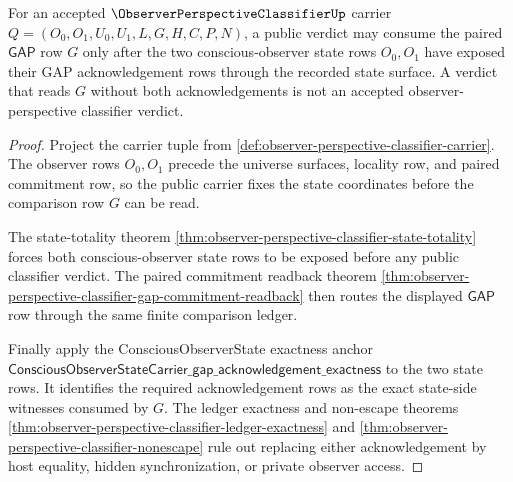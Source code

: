 \begin{theorem}
\label{thm:observer-perspective-classifier-observer-state-gap-route}
For an accepted $\ObserverPerspectiveClassifierUp$ carrier $Q=(O_0,O_1,U_0,U_1,L,G,H,C,P,N)$, a public verdict may consume the paired $\mathsf{GAP}$ row $G$ only after the two conscious-observer state rows $O_0,O_1$ have exposed their GAP acknowledgement rows through the recorded state surface. A verdict that reads $G$ without both acknowledgements is not an accepted observer-perspective classifier verdict.
\end{theorem}
\begin{proof}
Project the carrier tuple from \autoref{def:observer-perspective-classifier-carrier}. The observer rows $O_0,O_1$ precede the universe surfaces, locality row, and paired commitment row, so the public carrier fixes the state coordinates before the comparison row $G$ can be read.

The state-totality theorem \autoref{thm:observer-perspective-classifier-state-totality} forces both conscious-observer state rows to be exposed before any public classifier verdict. The paired commitment readback theorem \autoref{thm:observer-perspective-classifier-gap-commitment-readback} then routes the displayed $\mathsf{GAP}$ row through the same finite comparison ledger.

Finally apply the ConsciousObserverState exactness anchor $\mathsf{ConsciousObserverStateCarrier\_gap\_acknowledgement\_exactness}$ to the two state rows. It identifies the required acknowledgement rows as the exact state-side witnesses consumed by $G$. The ledger exactness and non-escape theorems \autoref{thm:observer-perspective-classifier-ledger-exactness} and \autoref{thm:observer-perspective-classifier-nonescape} rule out replacing either acknowledgement by host equality, hidden synchronization, or private observer access.
\end{proof}

